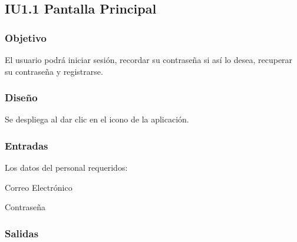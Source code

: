 \newpage
\subsection{IU1.1 Pantalla Principal}

\subsubsection{Objetivo}
	El usuario podrá iniciar sesión, recordar su contraseña si así lo desea, recuperar su contraseña y registrarse.  

\subsubsection{Diseño}
	Se despliega al dar clic en el icono de la aplicación.


\subsubsection{Entradas}
Los datos del personal requeridos:
\begin{Citemize} 
	\item Correo Electrónico
	\item Contraseña
\end{Citemize}

\subsubsection{Salidas}
\begin{Citemize}
	\item {}
	\item {}
	\item {}
	\item {}
\end{Citemize}
